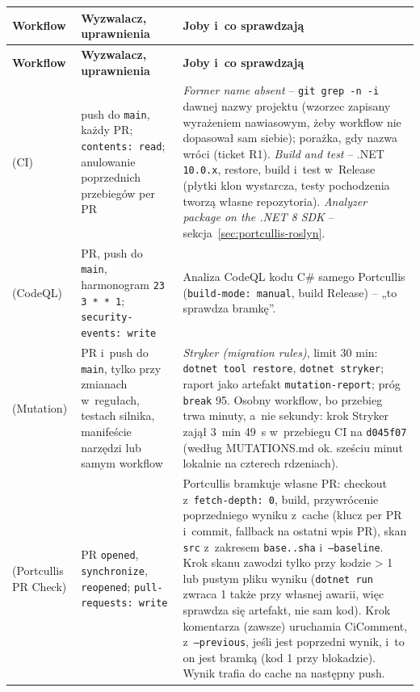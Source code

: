 \begingroup\small
\begin{xltabular}{\linewidth}{@{}>{\raggedright\arraybackslash}p{3.1cm} >{\raggedright\arraybackslash}p{3.3cm} >{\raggedright\arraybackslash}X@{}}
\toprule
\textbf{Workflow} & \textbf{Wyzwalacz, uprawnienia} & \textbf{Joby i~co sprawdzają} \\
\midrule
\endfirsthead
\toprule
\textbf{Workflow} & \textbf{Wyzwalacz, uprawnienia} & \textbf{Joby i~co sprawdzają} \\
\midrule
\endhead
{} (CI) & push do \texttt{main}, każdy PR; \texttt{contents: read}; anulowanie poprzednich przebiegów per PR & \emph{Former name absent} -- \texttt{git grep -n -i} dawnej nazwy projektu (wzorzec zapisany wyrażeniem nawiasowym, żeby workflow nie dopasował sam siebie); porażka, gdy nazwa wróci (ticket R1). \emph{Build and test} -- .NET \texttt{10.0.x}, restore, build i~test w~Release (płytki klon wystarcza, testy pochodzenia tworzą własne repozytoria). \emph{Analyzer package on the .NET 8 SDK} -- sekcja~\ref{sec:portcullis-roslyn}. \\
 (CodeQL) & PR, push do \texttt{main}, harmonogram \texttt{23 3 * * 1}; \texttt{security-events: write} & Analiza CodeQL kodu C\# samego Portcullis (\texttt{build-mode: manual}, build Release) -- „to sprawdza bramkę”. \\
 (Mutation) & PR i~push do \texttt{main}, tylko przy zmianach w~regułach, testach silnika, manifeście narzędzi lub samym workflow & \emph{Stryker (migration rules)}, limit 30 min: \texttt{dotnet tool restore}, \texttt{dotnet stryker}; raport jako artefakt \texttt{mutation-report}; próg \texttt{break} 95. Osobny workflow, bo przebieg trwa minuty, a~nie sekundy: krok Stryker zajął 3~min 49~s w~przebiegu CI na \texttt{d045f07} (według MUTATIONS.md ok. sześciu minut lokalnie na czterech rdzeniach). \\
 (Portcullis PR Check) & PR \texttt{opened}, \texttt{synchronize}, \texttt{reopened}; \texttt{pull-requests: write} & Portcullis bramkuje własne PR: checkout z~\texttt{fetch-depth: 0}, build, przywrócenie poprzedniego wyniku z~cache (klucz per PR i~commit, fallback na ostatni wpis PR), skan \texttt{src} z~zakresem \texttt{base..sha} i~\texttt{--baseline}. Krok skanu zawodzi tylko przy kodzie > 1 lub pustym pliku wyniku (\texttt{dotnet run} zwraca 1 także przy własnej awarii, więc sprawdza się artefakt, nie sam kod). Krok komentarza (zawsze) uruchamia CiComment, z~\texttt{--previous}, jeśli jest poprzedni wynik, i~to on jest bramką (kod 1 przy blokadzie). Wynik trafia do cache na następny push. \\

\end{xltabular}
